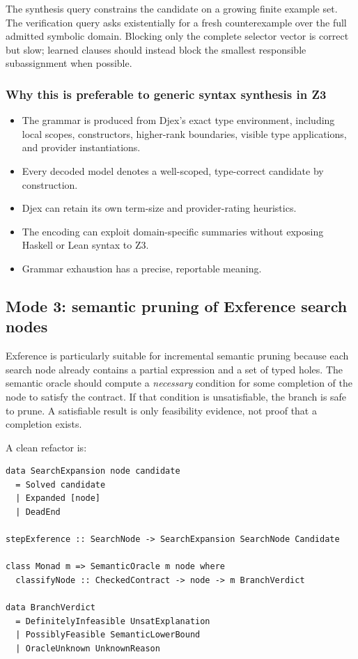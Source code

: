 \documentclass[11pt,oneside]{article}
\begin{document}
The synthesis query constrains the candidate on a growing finite example set. The
verification query asks existentially for a fresh counterexample over the full admitted
symbolic domain. Blocking only the complete selector vector is correct but slow;
learned clauses should instead block the smallest responsible subassignment when
possible.

\subsubsection{Why this is preferable to generic syntax synthesis in Z3}

\begin{itemize}
  \item The grammar is produced from Djex's exact type environment, including local
        scopes, constructors, higher-rank boundaries, visible type applications, and
        provider instantiations.
  \item Every decoded model denotes a well-scoped, type-correct candidate by
        construction.
  \item Djex can retain its own term-size and provider-rating heuristics.
  \item The encoding can exploit domain-specific summaries without exposing Haskell or
        Lean syntax to Z3.
  \item Grammar exhaustion has a precise, reportable meaning.
\end{itemize}

\subsection{Mode 3: semantic pruning of Exference search nodes}

Exference is particularly suitable for incremental semantic pruning because each
search node already contains a partial expression and a set of typed holes. The
semantic oracle should compute a \emph{necessary} condition for some completion of the
node to satisfy the contract. If that condition is unsatisfiable, the branch is safe to
prune. A satisfiable result is only feasibility evidence, not proof that a completion
exists.

A clean refactor is:

\begin{lstlisting}[language=HaskellExt,caption={Effectful driver around a pure search step}]
data SearchExpansion node candidate
  = Solved candidate
  | Expanded [node]
  | DeadEnd

stepExference :: SearchNode -> SearchExpansion SearchNode Candidate

class Monad m => SemanticOracle m node where
  classifyNode :: CheckedContract -> node -> m BranchVerdict

data BranchVerdict
  = DefinitelyInfeasible UnsatExplanation
  | PossiblyFeasible SemanticLowerBound
  | OracleUnknown UnknownReason
\end{lstlisting}
\end{document}
